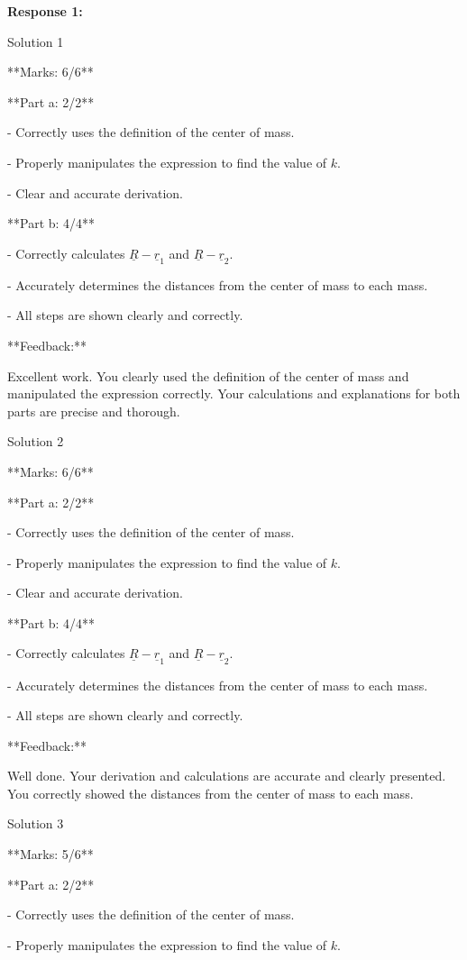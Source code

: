 \documentclass[a4paper,11pt]{article}
\begin{document}
\textbf{Response 1:}

Solution 1

**Marks: 6/6**

**Part a: 2/2**

- Correctly uses the definition of the center of mass.

- Properly manipulates the expression to find the value of \( k \).

- Clear and accurate derivation.

**Part b: 4/4**

- Correctly calculates \( \underline{R} - \underline{r}_1 \) and \( \underline{R} - \underline{r}_2 \).

- Accurately determines the distances from the center of mass to each mass.

- All steps are shown clearly and correctly.

**Feedback:**

Excellent work. You clearly used the definition of the center of mass and manipulated the expression correctly. Your calculations and explanations for both parts are precise and thorough.

Solution 2

**Marks: 6/6**

**Part a: 2/2**

- Correctly uses the definition of the center of mass.

- Properly manipulates the expression to find the value of \( k \).

- Clear and accurate derivation.

**Part b: 4/4**

- Correctly calculates \( \underline{R} - \underline{r}_1 \) and \( \underline{R} - \underline{r}_2 \).

- Accurately determines the distances from the center of mass to each mass.

- All steps are shown clearly and correctly.

**Feedback:**

Well done. Your derivation and calculations are accurate and clearly presented. You correctly showed the distances from the center of mass to each mass.

Solution 3

**Marks: 5/6**

**Part a: 2/2**

- Correctly uses the definition of the center of mass.

- Properly manipulates the expression to find the value of \( k \).
\end{document}

